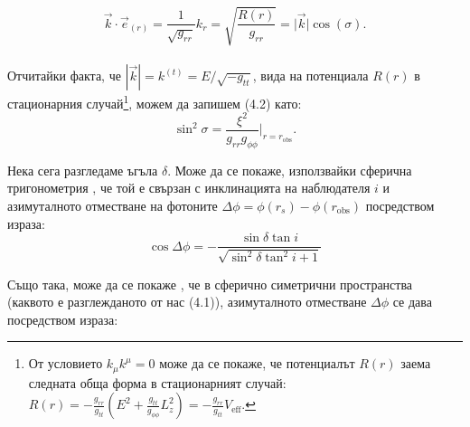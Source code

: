 \documentclass[12pt]{article}
\numberwithin{equation}{section}
\numberwithin{figure}{section}
\begin{document}
	\begin{equation}
		\vec{k} \cdot \vec{e}_{(r)} = \frac{1}{\sqrt{g_{rr}}}k_{r} = \sqrt{\frac{R(r)}{g_{rr}}} =  \big\vert \vec{k}\big\vert \cos(\sigma).
	\end{equation}\\
	Отчитайки факта, че $|\vec{k}| = k^{(t)} = E/\sqrt{-g_{tt}}$,  вида на потенциала $R(r)$ в стационарния случай\footnote{От условието $k_\mu k^\mu = 0$ може да се покаже, че потенциалът $R(r)$ заема следната обща форма в стационарният случай: $R(r) = -\frac{g_{rr}}{g_{tt}}\left(E^2 + \frac{g_{tt}}{g_{\phi\phi}}L_z^2\right) = -\frac{g_{rr}}{g_{tt}} V_\text{eff}$.}, можем да запишем (4.2) като:
	\begin{equation}
		\sin^2\sigma = \frac{\xi^2}{g_{rr}g_{\phi\phi}}\bigg\vert_{r = r_\text{obs}}.
	\end{equation}
	
	Нека сега разгледаме ъгъла $\delta$. Може да се покаже, използвайки сферична тригонометрия \cite{Muller2009}, че той е свързан с инклинацията на наблюдателя $i$ и азимуталното отместване на фотоните $\Delta\phi = \phi(r_s) - \phi(r_\text{obs})$ посредством израза:
	\begin{equation}
		\cos\Delta\phi = - \frac{\sin\delta\tan i}{\sqrt{\sin^2\delta\tan^2 i + 1}}
	\end{equation}
	
	Също така, може да се покаже \cite{Muller2009}, че в сферично симетрични пространства (каквото е разглежданото от нас (4.1)), азимуталното отместване $\Delta\phi$ се дава посредством израза:
	
\end{document}
